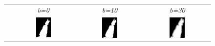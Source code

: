 \begin{figure}
\centering
\begin{tabular}{cc:c:c}
& \textit{b=0} & \textit{b=10} & \textit{b=30} \\
 & \includegraphics[width=0.25\textwidth]{images/filtering/mask0.png} & \includegraphics[width=0.25\textwidth]{images/filtering/mask10_ext.png} & \includegraphics[width=0.25\textwidth]{images/filtering/mask30_ext.png} \\

\end{tabular}
\end{figure}
